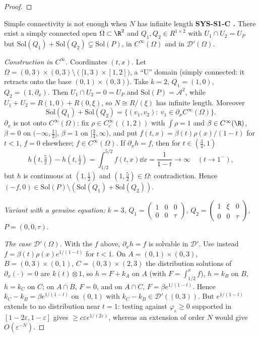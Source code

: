 \begin{proof}
\end{proof}

\begin{falsebox}{Simple connectivity is not enough when $N$ has infinite length}{\falsest}\label{cex:cIIIS1C}
\textbf{SYS-S1-C .} There exist a simply connected open $\Omega\subset\R^2$ and $Q_1,Q_2\in R^{1\times2}$ with $U_1\cap U_2=U_P$ but $\mathrm{Sol}(Q_1)+\mathrm{Sol}(Q_2)\subsetneq\mathrm{Sol}(P)$, in $C^\infty(\Omega)$ and in $\mathcal D'(\Omega)$.
\end{falsebox}
\begin{proof}[Construction in $C^\infty$]
Coordinates $(t,x)$. Let $\Omega=(0,3)\times(0,3)\setminus([1,3)\times[1,2])$, a ``U'' domain (simply connected: it retracts onto the base $(0,1)\times(0,3)$). Take $k=2$, $Q_1=(1,0)$, $Q_2=(1,\partial_x)$. Then $U_1\cap U_2=0=U_P$ and $\mathrm{Sol}(P)=\mathcal A^2$, while $U_1+U_2=R(1,0)+R(0,\xi)$, so $N\cong R/(\xi)$ has infinite length. Moreover
\[
\mathrm{Sol}(Q_1)+\mathrm{Sol}(Q_2)=\{(v_1,v_2):\ v_1\in\partial_xC^\infty(\Omega)\}.
\]
$\partial_x$ is not onto $C^\infty(\Omega)$: fix $\rho\in C_c^\infty((1,2))$ with $\int\rho=1$ and $\beta\in C^\infty(\R)$, $\beta=0$ on $(-\infty,\tfrac12]$, $\beta=1$ on $[\tfrac34,\infty)$, and put $f(t,x)=\beta(t)\rho(x)/(1-t)$ for $t<1$, $f=0$ elsewhere; $f\in C^\infty(\Omega)$. If $\partial_xh=f$, then for $t\in(\tfrac34,1)$
\[
h(t,\tfrac52)-h(t,\tfrac12)=\int_{1/2}^{5/2}f(t,x)\dd x=\frac1{1-t}\to\infty\quad(t\to1^-),
\]
but $h$ is continuous at $(1,\tfrac12)$ and $(1,\tfrac52)\in\Omega$: contradiction. Hence $(-f,0)\in\mathrm{Sol}(P)\setminus(\mathrm{Sol}(Q_1)+\mathrm{Sol}(Q_2))$.

\emph{Variant with a genuine equation:} $k=3$, $Q_1=\begin{pmatrix}1&0&0\\0&0&\tau\end{pmatrix}$, $Q_2=\begin{pmatrix}1&\xi&0\\0&0&\tau\end{pmatrix}$, $P=(0,0,\tau)$.

\emph{The case $\mathcal D'(\Omega)$.} With the $f$ above, $\partial_xh=f$ is solvable in $\mathcal D'$. Use instead $f=\beta(t)\rho(x)e^{1/(1-t)}$ for $t<1$. On $A=(0,1)\times(0,3)$, $B=(0,3)\times(0,1)$, $C=(0,3)\times(2,3)$ the distribution solutions of $\partial_x(\cdot)=0$ are $k(t)\otimes1$, so $h=F+k_A$ on $A$ (with $F=\int_{1/2}^xf$), $h=k_B$ on $B$, $h=k_C$ on $C$; on $A\cap B$, $F=0$, and on $A\cap C$, $F=\beta e^{1/(1-t)}$. Hence $k_C-k_B=\beta e^{1/(1-t)}$ on $(0,1)$ with $k_C-k_B\in\mathcal D'((0,3))$. But $e^{1/(1-t)}$ extends to no distribution near $t=1$: testing against $\varphi_\varepsilon\ge0$ supported in $[1-2\varepsilon,1-\varepsilon]$ gives $\ge c\varepsilon e^{1/(2\varepsilon)}$, whereas an extension of order $N$ would give $O(\varepsilon^{-N})$.
\end{proof}
